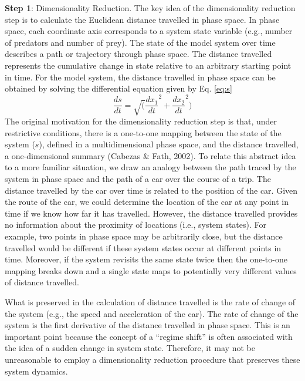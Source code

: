 \documentclass[12pt,twoside,openany]{reedthesis}
\begin{document}
\textbf{Step 1}: Dimensionality Reduction. The key idea of the dimensionality reduction step is to calculate the Euclidean distance travelled in phase space. In phase space, each coordinate axis corresponds to a system state variable (e.g., number of predators and number of prey). The state of the model system over time describes a path or trajectory through phase space. The distance travelled represents the cumulative change in state relative to an arbitrary starting point in time. For the model system, the distance travelled in phase space can be obtained by solving the differential equation given by Eq. \eqref{eq:s}
\begin{equation}  
\frac{ds}{dt} = \sqrt(\frac{dx_1}{dt}^2 + \frac{dx_2}{dt}^2)
\label{eq:s}
\end{equation}
The original motivation for the dimensionality reduction step is that, under restrictive conditions, there is a one-to-one mapping between the state of the system (\(s\)), defined in a multidimensional phase space, and the distance travelled, a one-dimensional summary (Cabezas \& Fath, 2002). To relate this abstract idea to a more familiar situation, we draw an analogy between the path traced by the system in phase space and the path of a car over the course of a trip. The distance travelled by the car over time is related to the position of the car. Given the route of the car, we could determine the location of the car at any point in time if we know how far it has travelled. However, the distance travelled provides no information about the proximity of locations (i.e., system states). For example, two points in phase space may be arbitrarily close, but the distance travelled would be different if these system states occur at different points in time. Moreover, if the system revisits the same state twice then the one-to-one mapping breaks down and a single state maps to potentially very different values of distance travelled.

What is preserved in the calculation of distance travelled is the rate of change of the system (e.g., the speed and acceleration of the car). The rate of change of the system is the first derivative of the distance travelled in phase space. This is an important point because the concept of a ``regime shift'' is often associated with the idea of a sudden change in system state. Therefore, it may not be unreasonable to employ a dimensionality reduction procedure that preserves these system dynamics.
\end{document}

